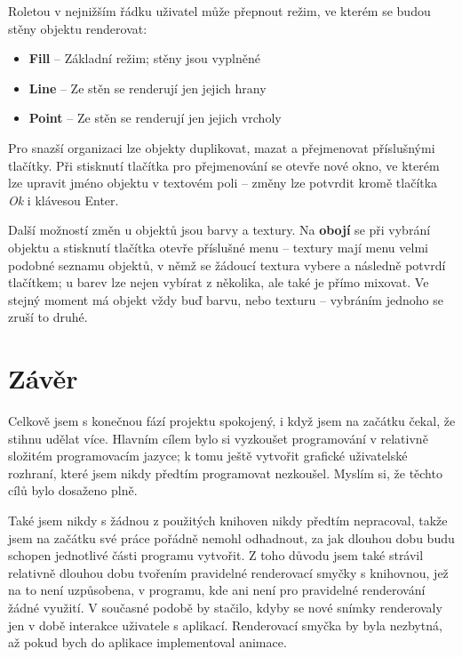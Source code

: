 \documentclass[a4paper, 11pt]{report}
\begin{document}
\begin{samepage}
Roletou v nejnižším řádku uživatel může přepnout režim, ve kterém se budou stěny objektu renderovat:
\begin{itemize}
    \item \textbf{Fill} -- Základní režim; stěny jsou vyplněné
    \item \textbf{Line} -- Ze stěn se renderují jen jejich hrany
    \item \textbf{Point} -- Ze stěn se renderují jen jejich vrcholy
\end{itemize}
\end{samepage}

Pro snazší organizaci lze objekty duplikovat, mazat a přejmenovat příslušnými tlačítky. Při stisknutí tlačítka pro přejmenování se otevře nové okno, ve kterém lze upravit jméno objektu v textovém poli -- změny lze potvrdit kromě tlačítka \emph{Ok} i klávesou Enter.

Další možností změn u objektů jsou barvy a textury. Na \textbf{obojí} se při vybrání objektu a stisknutí tlačítka otevře příslušné menu -- textury mají menu velmi podobné seznamu objektů, v němž se žádoucí textura vybere a následně potvrdí tlačítkem; u barev lze nejen vybírat z několika, ale také je přímo mixovat. Ve stejný moment má objekt vždy buď barvu, nebo texturu -- vybráním jednoho se zruší to druhé.

\chapter{Závěr}
Celkově jsem s konečnou fází projektu spokojený, i když jsem na začátku čekal, že stihnu udělat více. Hlavním cílem bylo si vyzkoušet programování v relativně složitém programovacím jazyce; k tomu ještě vytvořit grafické uživatelské rozhraní, které jsem nikdy předtím programovat nezkoušel. Myslím si, že těchto cílů bylo dosaženo plně. 

Také jsem nikdy s žádnou z použitých knihoven nikdy předtím nepracoval, takže jsem na začátku své práce pořádně nemohl odhadnout, za jak dlouhou dobu budu schopen jednotlivé části programu vytvořit. Z toho důvodu jsem také strávil relativně dlouhou dobu tvořením pravidelné renderovací smyčky s knihovnou, jež na to není uzpůsobena, v programu, kde ani není pro pravidelné renderování žádné využití. V současné podobě by stačilo, kdyby se nové snímky renderovaly jen v době interakce uživatele s aplikací. Renderovací smyčka by byla nezbytná, až pokud bych do aplikace implementoval animace.
\end{document}

